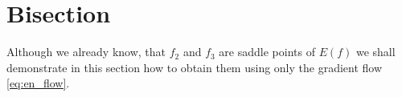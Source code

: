 \section{Bisection}
\label{sec:bisection}


Although we already know, that $f_2$ and $f_3$ are saddle points of
$E(f)$ we shall demonstrate in this section how to obtain them using
only the gradient flow \eqref{eq:en_flow}.\\


